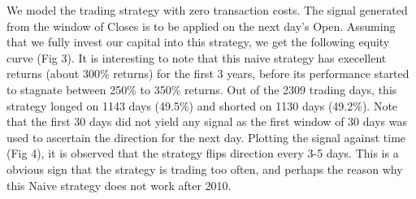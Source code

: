 \documentclass[12pt]{article}
\theoremstyle{definition}
\begin{document}
We model the trading strategy with zero transaction costs. The signal generated from the window of Closes is to be applied on the next day's Open. Assuming that we fully invest our capital into this strategy, we get the following equity curve (Fig 3). It is interesting to note that this naive strategy has execellent returns (about 300\% returns) for the first 3 years, before its performance started to stagnate between 250\% to 350\% returns. Out of the 2309 trading days, this strategy longed on 1143 days (49.5\%) and shorted on 1130 days (49.2\%). Note that the first 30 days did not yield any signal as the first window of 30 days was used to ascertain the direction for the next day. Plotting the signal against time (Fig 4), it is observed that the strategy flips direction every 3-5 days. This is a obvious sign that the strategy is trading too often, and perhaps the reason why this Naive strategy does not work after 2010.
\end{document}
